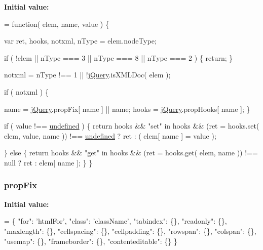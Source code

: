 {\bfseries Initial value\-:}
\begin{DoxyCode}
= \textcolor{keyword}{function}( elem, name, value ) \{

        var ret, hooks, notxml,
            nType = elem.nodeType;

        
        \textcolor{keywordflow}{if} ( !elem || nType === 3 || nType === 8 || nType === 2 ) \{
            \textcolor{keywordflow}{return};
        \}

        notxml = nType !== 1 || !\hyperlink{jquery-1_810_82-vsdoc_8js_add5237586d970a38a81f990e8eb28c6c}{jQuery}.isXMLDoc( elem );

        \textcolor{keywordflow}{if} ( notxml ) \{
            
            name = \hyperlink{jquery-1_810_82-vsdoc_8js_add5237586d970a38a81f990e8eb28c6c}{jQuery}.propFix[ name ] || name;
            hooks = \hyperlink{jquery-1_810_82-vsdoc_8js_add5237586d970a38a81f990e8eb28c6c}{jQuery}.propHooks[ name ];
        \}

        \textcolor{keywordflow}{if} ( value !== \hyperlink{jquery-1_810_82-vsdoc_8js_a08113a236cc18d2a9d5ce27e638012be}{undefined} ) \{
            \textcolor{keywordflow}{return} hooks && \textcolor{stringliteral}{"set"} in hooks && (ret = hooks.set( elem, value, name )) !== 
      \hyperlink{jquery-1_810_82-vsdoc_8js_a08113a236cc18d2a9d5ce27e638012be}{undefined} ?
                ret :
                ( elem[ name ] = value );

        \} \textcolor{keywordflow}{else} \{
            \textcolor{keywordflow}{return} hooks && \textcolor{stringliteral}{"get"} in hooks && (ret = hooks.get( elem, name )) !== null ?
                ret :
                elem[ name ];
        \}
    \}
\end{DoxyCode}
\hypertarget{jquery-1_810_82-vsdoc_8js_acdf840d8414190fd915ee5b9cc2fb8c5}{
\subsubsection[{prop\-Fix}]{ prop\-Fix}}\label{jquery-1_810_82-vsdoc_8js_acdf840d8414190fd915ee5b9cc2fb8c5}
{\bfseries Initial value\-:}
\begin{DoxyCode}
= \{ \textcolor{stringliteral}{"for"}: \textcolor{stringliteral}{'htmlFor'},
\textcolor{stringliteral}{"class"}: \textcolor{stringliteral}{'className'},
\textcolor{stringliteral}{"tabindex"}: \{\},
\textcolor{stringliteral}{"readonly"}: \{\},
\textcolor{stringliteral}{"maxlength"}: \{\},
\textcolor{stringliteral}{"cellspacing"}: \{\},
\textcolor{stringliteral}{"cellpadding"}: \{\},
\textcolor{stringliteral}{"rowspan"}: \{\},
\textcolor{stringliteral}{"colspan"}: \{\},
\textcolor{stringliteral}{"usemap"}: \{\},
\textcolor{stringliteral}{"frameborder"}: \{\},
\textcolor{stringliteral}{"contenteditable"}: \{\} \}
\end{DoxyCode}
